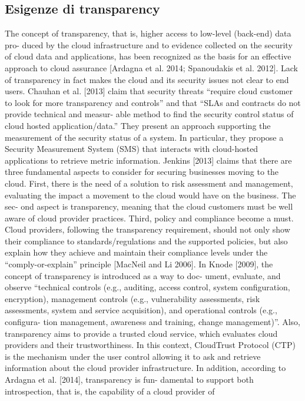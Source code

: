 \documentclass[../main.tex]{subfiles}
\begin{document}
\subsection{Esigenze di transparency}
The concept of transparency, that is, higher access to low-level (back-end) data pro-
duced by the cloud infrastructure and to evidence collected on the security of cloud
data and applications, has been recognized as the basis for an effective approach to
cloud assurance [Ardagna et al. 2014; Spanoudakis et al. 2012]. Lack of transparency
in fact makes the cloud and its security issues not clear to end users. Chauhan et al.
[2013] claim that security threats “require cloud customer to look for more transparency
and controls” and that “SLAs and contracts do not provide technical and measur-
able method to find the security control status of cloud hosted application/data.” They
present an approach supporting the measurement of the security status of a system.
In particular, they propose a Security Measurement System (SMS) that interacts with
cloud-hosted applications to retrieve metric information. Jenkins [2013] claims that
there are three fundamental aspects to consider for securing businesses moving to
the cloud. First, there is the need of a solution to risk assessment and management,
evaluating the impact a movement to the cloud would have on the business. The sec-
ond aspect is transparency, meaning that the cloud customers must be well aware of
cloud provider practices. Third, policy and compliance become a must. Cloud providers,
following the transparency requirement, should not only show their compliance to
standards/regulations and the supported policies, but also explain how they achieve
and maintain their compliance levels under the “comply-or-explain” principle [MacNeil
and Li 2006]. In Knode [2009], the concept of transparency is introduced as a way to doc-
ument, evaluate, and observe “technical controls (e.g., auditing, access control, system
configuration, encryption), management controls (e.g., vulnerability assessments, risk
assessments, system and service acquisition), and operational controls (e.g., configura-
tion management, awareness and training, change management)”. Also, transparency
aims to provide a trusted cloud service, which evaluates cloud providers and their
trustworthiness. In this context, CloudTrust Protocol (CTP) is the mechanism under
the user control allowing it to ask and retrieve information about the cloud provider
infrastructure. In addition, according to Ardagna et al. [2014], transparency is fun-
damental to support both introspection, that is, the capability of a cloud provider of
\end{document}
